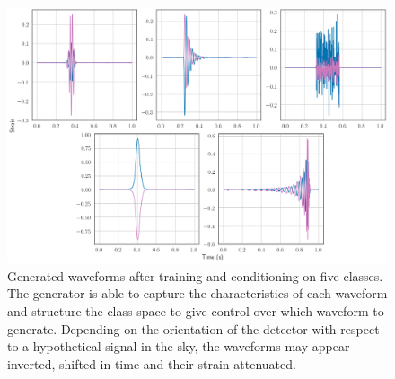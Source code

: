 \documentclass[12pt]{iopart}
\begin{document}
\begin{figure}
    \centering
    \includegraphics[width=\textwidth]{figures/gen_sigs.png}
    \caption{Generated waveforms after training and conditioning on five classes. The generator is able to capture the characteristics of each waveform and structure the class space to give control over which waveform to generate. Depending on the orientation of the detector with respect to a hypothetical signal in the sky, the waveforms may appear inverted, shifted in time and their strain attenuated.}
    \label{fig:gen_signals}
\end{figure}
\end{document}
